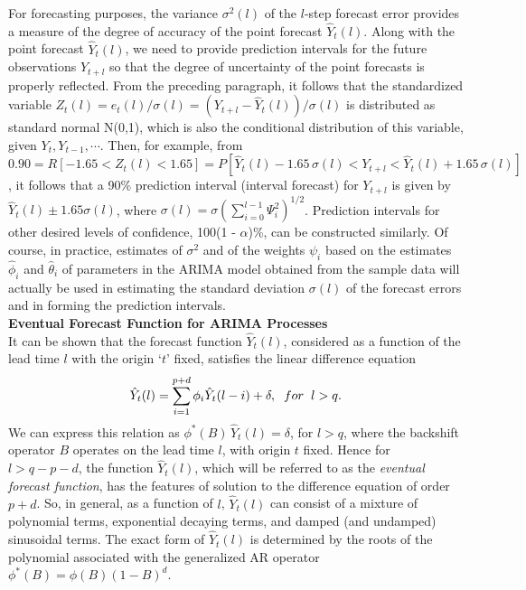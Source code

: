 For forecasting purposes, the variance $\sigma^2(l)$ of the $l$-step forecast error provides a measure of the degree of accuracy of the point forecast $\hat{Y}_t(l)$. Along with the point forecast $\hat{Y}_t(l)$, we need to provide prediction intervals for the future observations $Y_{t+l}$ so that the degree of uncertainty of the point forecasts is properly reflected. From the preceding paragraph, it follows that the standardized variable $Z_t(l) = e_t(l)/\sigma(l)= (Y_{t+l} - \hat{Y}_t(l))/\sigma(l)$ is distributed as standard normal N(0,1), which is also the conditional distribution of this variable, given $Y_t, Y_{t-1},\cdots$. Then, for example, from $0.90 = R[-1.65 < Z_t(l) < 1.65] = P[\hat{Y}_t(l) - 1.65\,\sigma(l) < Y_{t+l} < \hat{Y}_t(l) + 1.65\,\sigma(l)]$, it follows that a 90\% prediction interval (interval forecast) for $Y_{t+l}$ is given by $\hat{Y}_t(l) \pm 1.65\sigma(l)$, where $\sigma(l) = \sigma(\sum_{i=0}^{l-1}\Psi_i^2)^{1/2}$. Prediction intervals for other desired levels of confidence, 100(1 - $\alpha$)\%, can be constructed similarly. Of course, in practice, estimates of $\sigma^2$ and of the weights $\psi_i$ based on the estimates $\hat{\phi}_i$ and $\hat{\theta}_i$ of parameters in the ARIMA model obtained from the sample data will actually be used in estimating the standard deviation $\sigma(l)$ of the forecast errors and in forming the prediction intervals. \\


\noindent\textbf{Eventual Forecast Function for ARIMA Processes} \\


It can be shown that the forecast function $\hat{Y}_t(l)$, considered as a function of the lead time $l$ with the origin `$t$' fixed, satisfies the linear difference equation
	\begin{equation}\label{eqn:2twoyhat}
	\hat{Y}_t(l) = \sum_{i=1}^{p+d}\phi_i\hat{Y}_t(l-i) + \delta,\hspace{0.2cm}for\hspace{0.2cm}l > q.
	\end{equation}
We can express this relation as $\phi^*(B)\,\hat{Y}_t(l) = \delta$, for $l > q$, where the backshift operator $B$ operates on the lead time $l$, with origin $t$ fixed. Hence for $l > q-p-d$, the function $\hat{Y}_t(l)$, which will be referred to as the \textit{eventual forecast function}, has the features of solution to the difference equation of order $p+d$. So, in general, as a function of $l$, $\hat{Y}_t(l)$ can consist of a mixture of polynomial terms, exponential decaying terms, and damped (and undamped) sinusoidal terms. The exact form of $\hat{Y}_t(l)$ is determined by the roots of the polynomial associated with the generalized AR operator $\phi^*(B) = \phi(B)(1 - B)^d$. 


